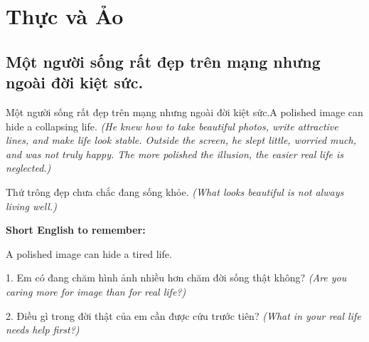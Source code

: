\chapter{Thực và Ảo}

\section{Một người sống rất đẹp trên mạng nhưng ngoài đời kiệt sức.}
\begin{truyen}{Một người sống rất đẹp trên mạng nhưng ngoài đời kiệt sức.}{A polished image can hide a collapsing life.}
\textit{(He knew how to take beautiful photos, write attractive lines, and make life look stable. Outside the screen, he slept little, worried much, and was not truly happy. The more polished the illusion, the easier real life is neglected.)}
\end{truyen}
\begin{baihoc}
Thứ trông đẹp chưa chắc đang sống khỏe.
\textit{(What looks beautiful is not always living well.)}
\end{baihoc}
\begin{ghinhoanh}
\textbf{Short English to remember:}

A polished image can hide a tired life.
\end{ghinhoanh}
\begin{tuhocnhanh}
1. Em có đang chăm hình ảnh nhiều hơn chăm đời sống thật không? \textit{(Are you caring more for image than for real life?)}

2. Điều gì trong đời thật của em cần được cứu trước tiên? \textit{(What in your real life needs help first?)}
\end{tuhocnhanh}
\ngancach

